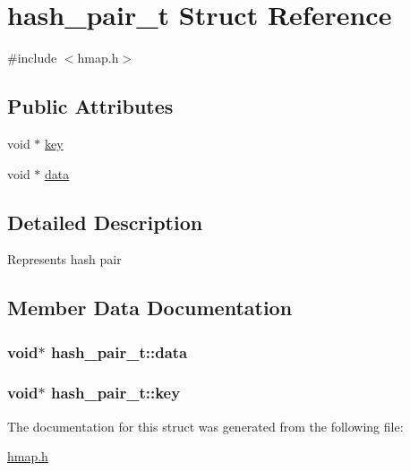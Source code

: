 \hypertarget{structhash__pair__t}{}\section{hash\+\_\+pair\+\_\+t Struct Reference}
\label{structhash__pair__t}


{\ttfamily \#include $<$hmap.\+h$>$}

\subsection*{Public Attributes}
\begin{DoxyCompactItemize}
\item 
void $\ast$ \hyperlink{structhash__pair__t_a73a81d452a6b8388c67be98a54a2f05b}{key}
\item 
void $\ast$ \hyperlink{structhash__pair__t_a482d93b4058d2196d7a07bb20f4a40fd}{data}
\end{DoxyCompactItemize}


\subsection{Detailed Description}
Represents hash pair 

\subsection{Member Data Documentation}
\hypertarget{structhash__pair__t_a482d93b4058d2196d7a07bb20f4a40fd}{}
\subsubsection[{data}]{\setlength{\rightskip}{0pt plus 5cm}void$\ast$ hash\+\_\+pair\+\_\+t\+::data}\label{structhash__pair__t_a482d93b4058d2196d7a07bb20f4a40fd}
\hypertarget{structhash__pair__t_a73a81d452a6b8388c67be98a54a2f05b}{}
\subsubsection[{key}]{\setlength{\rightskip}{0pt plus 5cm}void$\ast$ hash\+\_\+pair\+\_\+t\+::key}\label{structhash__pair__t_a73a81d452a6b8388c67be98a54a2f05b}


The documentation for this struct was generated from the following file\+:\begin{DoxyCompactItemize}
\item 
\hyperlink{hmap_8h}{hmap.\+h}\end{DoxyCompactItemize}
